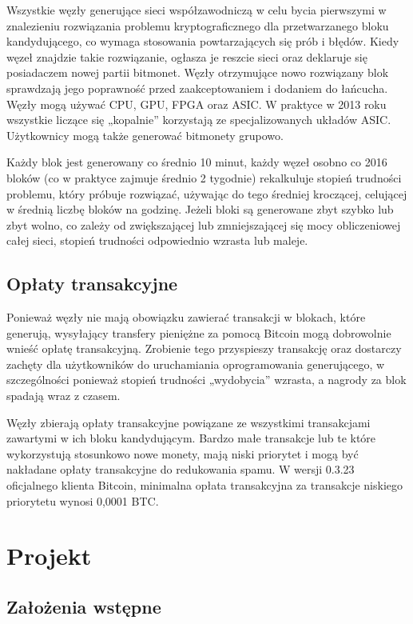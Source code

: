 \documentclass[11pt,a4paper]{article}
\begin{document}
Wszystkie węzły generujące sieci współzawodniczą w celu bycia pierwszymi w znalezieniu rozwiązania problemu kryptograficznego dla przetwarzanego bloku kandydującego, co wymaga stosowania powtarzających się prób i błędów. Kiedy węzeł znajdzie takie rozwiązanie, ogłasza je reszcie sieci oraz deklaruje się posiadaczem nowej partii bitmonet. Węzły otrzymujące nowo rozwiązany blok sprawdzają jego poprawność przed zaakceptowaniem i dodaniem do łańcucha. Węzły mogą używać CPU, GPU, FPGA oraz ASIC. W praktyce w 2013 roku wszystkie liczące się „kopalnie” korzystają ze specjalizowanych układów ASIC. Użytkownicy mogą także generować bitmonety grupowo.

Każdy blok jest generowany co średnio 10 minut, każdy węzeł osobno co 2016 bloków (co w praktyce zajmuje średnio 2 tygodnie) rekalkuluje stopień trudności problemu, który próbuje rozwiązać, używając do tego średniej kroczącej, celującej w średnią liczbę bloków na godzinę. Jeżeli bloki są generowane zbyt szybko lub zbyt wolno, co zależy od zwiększającej lub zmniejszającej się mocy obliczeniowej całej sieci, stopień trudności odpowiednio wzrasta lub maleje.

\subsection{Opłaty transakcyjne}

Ponieważ węzły nie mają obowiązku zawierać transakcji w blokach, które generują, wysyłający transfery pieniężne za pomocą Bitcoin mogą dobrowolnie wnieść opłatę transakcyjną. Zrobienie tego przyspieszy transakcję oraz dostarczy zachęty dla użytkowników do uruchamiania oprogramowania generującego, w szczególności ponieważ stopień trudności „wydobycia” wzrasta, a nagrody za blok spadają wraz z czasem.

Węzły zbierają opłaty transakcyjne powiązane ze wszystkimi transakcjami zawartymi w ich bloku kandydującym. Bardzo małe transakcje lub te które wykorzystują stosunkowo nowe monety, mają niski priorytet i mogą być nakładane opłaty transakcyjne do redukowania spamu. W wersji 0.3.23 oficjalnego klienta Bitcoin, minimalna opłata transakcyjna za transakcje niskiego priorytetu wynosi 0,0001 BTC.

\section{Projekt}



\subsection{Założenia wstępne}
\end{document}
